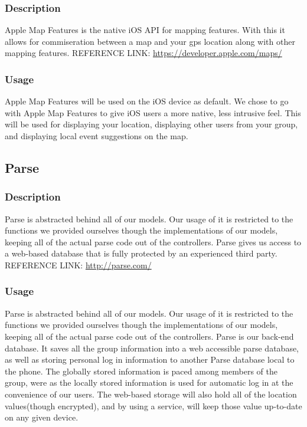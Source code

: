 	\subsubsection{Description}
	Apple Map Features is the native iOS API for mapping features. With this it allows for commiseration between a map and your gps location along with other mapping features.
\newline
REFERENCE LINK: \url{https://developer.apple.com/maps/}
	\subsubsection{Usage}
	Apple Map Features will be used on the iOS device as default. We chose to go with Apple Map Features to give iOS users a more native, less intrusive feel. This will be used for displaying your location, displaying other users from your group, and displaying local event suggestions on the map.

\subsection{Parse}
	\subsubsection{Description}
	Parse is abstracted behind all of our models. Our usage of it is restricted to the functions we provided ourselves though the implementations of our models, keeping all of the actual parse code out of the controllers. Parse gives us access to a web-based database that is fully protected by an experienced third party.
\newline
REFERENCE LINK: \url{http://parse.com/}
	\subsubsection{Usage}
	Parse is abstracted behind all of our models. Our usage of it is restricted to the functions we provided ourselves though the implementations of our models, keeping all of the actual parse code out of the controllers.
	Parse is our back-end database. It saves all the group information into a web accessible parse database, as well as storing personal log in information to another Parse database local to the phone. The globally stored information is paced among members of the group, were as the locally stored information is used for automatic log in at the convenience of our users. The web-based storage will also hold all of the location values(though encrypted), and by using a service, will keep those value up-to-date on any given device.
	

